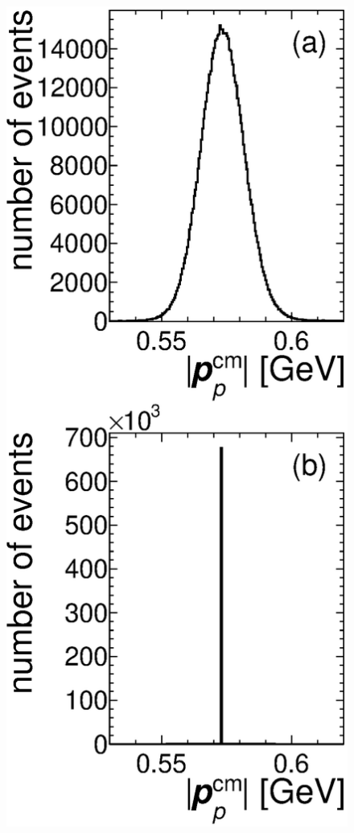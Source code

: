\begin{figure}[hbp]\centering
\includegraphics[height=0.3\textheight]{pics/drawMom.eps}

\end{figure}
